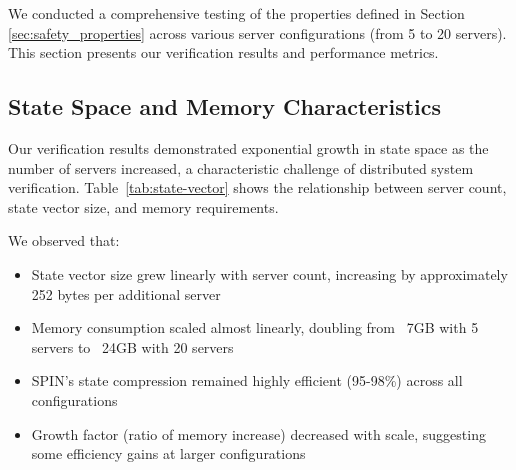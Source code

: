 We conducted a comprehensive testing of the properties defined in Section \ref{sec:safety_properties} across various server configurations (from 5 to 20 servers). This section presents our verification results and performance metrics.

\subsection{State Space and Memory Characteristics}
\label{sec:state_space}

Our verification results demonstrated exponential growth in state space as the number of servers increased, a characteristic challenge of distributed system verification. Table~\ref{tab:state-vector} shows the relationship between server count, state vector size, and memory requirements.

\begin{table}[!htbp]
\centering
\caption{State Vector Size and Memory Characteristics by Server Count}
\label{tab:state-vector}
\end{table}

We observed that:
\begin{itemize}
    \item State vector size grew linearly with server count, increasing by approximately 252 bytes per additional server
    \item Memory consumption scaled almost linearly, doubling from ~7GB with 5 servers to ~24GB with 20 servers
    \item SPIN's state compression remained highly efficient (95-98\%) across all configurations
    \item Growth factor (ratio of memory increase) decreased with scale, suggesting some efficiency gains at larger configurations
\end{itemize}

